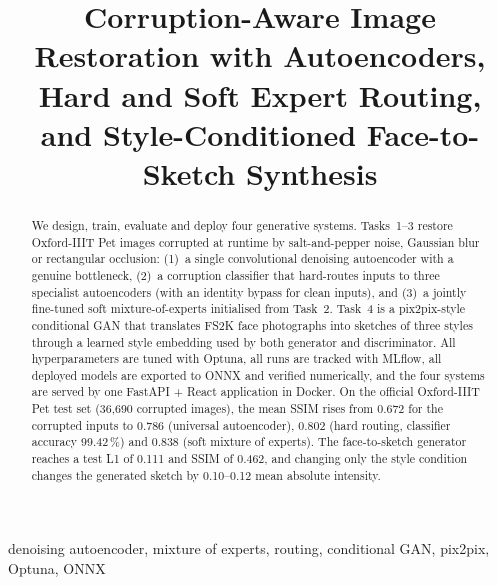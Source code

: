 \documentclass[conference]{IEEEtran}
\begin{document}
\title{Corruption-Aware Image Restoration with Autoencoders, Hard and Soft Expert Routing, and Style-Conditioned Face-to-Sketch Synthesis}

\author{
}

\maketitle

\begin{abstract}
We design, train, evaluate and deploy four generative systems. Tasks~1--3 restore Oxford-IIIT Pet images
corrupted at runtime by salt-and-pepper noise, Gaussian blur or rectangular occlusion: (1)~a single
convolutional denoising autoencoder with a genuine bottleneck, (2)~a corruption classifier that hard-routes
inputs to three specialist autoencoders (with an identity bypass for clean inputs), and (3)~a jointly
fine-tuned soft mixture-of-experts initialised from Task~2. Task~4 is a pix2pix-style conditional GAN that
translates FS2K face photographs into sketches of three styles through a learned style embedding used by
both generator and discriminator. All hyperparameters are tuned with Optuna, all runs are tracked with
MLflow, all deployed models are exported to ONNX and verified numerically, and the four systems are served
by one FastAPI + React application in Docker. On the official Oxford-IIIT Pet test set (36,690 corrupted
images), the mean SSIM rises from 0.672 for the corrupted inputs to 0.786 (universal autoencoder), 0.802
(hard routing, classifier accuracy 99.42\,\%) and 0.838 (soft mixture of experts). The face-to-sketch
generator reaches a test L1 of 0.111 and SSIM of 0.462, and changing only the style condition changes the
generated sketch by 0.10--0.12 mean absolute intensity.
\end{abstract}

\begin{IEEEkeywords}
denoising autoencoder, mixture of experts, routing, conditional GAN, pix2pix, Optuna, ONNX
\end{IEEEkeywords}

\end{document}
